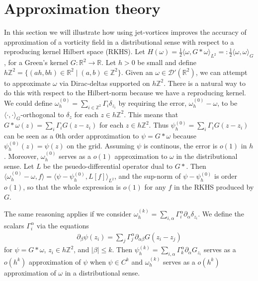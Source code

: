 \documentclass[12pt]{amsart}
\newcommand{\R}{\ensuremath{\mathbb{R}}}
\begin{document}
\section{Approximation theory}
\label{sec:approximation_theory}
In this section we will illustrate how using jet-vortices improves the accuracy of approximation of a vorticity field in a distributional sense
with respect to a reproducing kernel Hilbert space (RKHS).  Let $H(\omega) = \frac{1}{2} \langle \omega , G*\omega\rangle_{L^2} =: \frac{1}{2} \langle \omega , \omega \rangle_G$, for a Green's kernel $G:\R^2 \to \R$.
Let $h > 0$ be small and define $h \mathbb{Z}^2 = \{ (ah,bh) \in \R^2 \mid (a,b) \in \mathbb{Z}^2 \}$.
Given an $\omega \in \mathcal{D}'(\R^2)$, we can attempt to approximate $\omega$ via Dirac-deltas supported on $h \mathbb{Z}^2$.
There is a natural way to do this with respect to the Hilbert-norm because we have a reproducing kernel.
We could define $\omega_h^{(0)} = \sum_{i \in \mathbb{Z}^2} \Gamma_i \delta_{z_i}$ by requiring the error, $\omega_h^{(0)} - \omega$, to be $\langle \cdot , \cdot \rangle_{G}$-orthogonal to $\delta_z$ for each $z \in h \mathbb{Z}^2$.
This means that $G*\omega(z) =  \sum_i \Gamma_i G(z-z_i)$ for each $z \in h\mathbb{Z}^2$.
Thus $\psi_h^{(0)} = \sum_i \Gamma_i G(z-z_i)$ can be seen as a $0$th order approximation to $\psi = G*\omega$
because $\psi_h^{(0)}(z) = \psi(z)$ on the grid.
Assuming $\psi$ is continous, the error is $o(1)$ in $h$.
Moreover, $\omega^{(0)}_h$ serves as a $o(1)$ approximation to $\omega$ in the distributional sense.
Let $L$ be the psuedo-differential operator dual to $G*$.
Then $\langle \omega^{(0)}_h - \omega , f \rangle = \langle \psi - \psi_h^{(0)} , L[f] \rangle_{L^2}$,
and the sup-norm of $\psi-\psi_h^{(0)}$ is order $o(1)$, so that the whole expression is $o(1)$
for any $f$ in the RKHS produced by $G$.
 
The same reasoning applies if we consider $\omega^{(k)}_h = \sum_{i,\alpha} \Gamma_i^\alpha \partial_\alpha \delta_{z_i}$.
We define the scalars $\Gamma_i^\alpha$ via the equations
\begin{align*}
  \partial_\beta \psi (z_i) = \sum_j \Gamma_j^\alpha \partial_{\alpha\beta} G(z_i - z_j)
\end{align*}
for $\psi = G*\omega$, $z_i \in h \mathbb{Z}^2$, and $|\beta| \leq k$.
Then $\psi^{(k)}_h = \sum_{i,\alpha}\Gamma_k^\alpha \partial_\alpha G_{z_i}$
serves as a $o(h^{k})$ approximation of $\psi$ when $\psi \in C^k$
and $\omega^{(k)}_h$ serves as a $o(h^k)$ approximation of $\omega$ in
a distributional sense.
\end{document}
